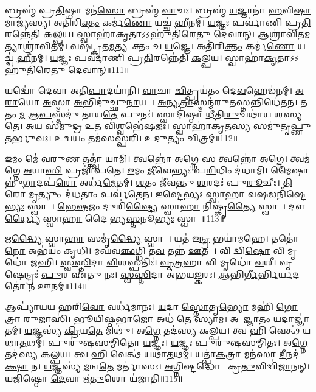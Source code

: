 𑌬𑍍𑌰𑌹𑍍𑌮॑ 𑌪𑍍𑌰\ul{𑌤𑌿}𑌷𑍍𑌠𑌾 𑌮𑌨॑\ul{𑌸𑍋} 𑌬𑍍𑌰𑌹𑍍𑌮॑ \ul{𑌵𑌾}𑌚𑌃।
𑌬𑍍𑌰𑌹𑍍𑌮॑ \ul{𑌯}𑌜𑍍𑌞𑌾𑌨𑌾॑ \ul{𑌹}𑌵𑌿\ul{𑌷𑌾}𑌮𑌾𑌜𑍍𑌯॑𑌸𑍍𑌯।
𑌅𑌤𑌿॑𑌰𑌿\ul{𑌕𑍍𑌤𑌂} 𑌕𑌰𑍍𑌮॑\ul{𑌣𑍋} 𑌯𑌚𑍍𑌚॑ \ul{𑌹𑍀}𑌨𑌮𑍍।
\ul{𑌯}𑌜𑍍𑌞𑌃 𑌪𑌰𑍍𑌵𑌾॑𑌣𑌿 𑌪𑍍𑌰\ul{𑌤𑌿}𑌰𑌨𑍍𑌨𑍇॑𑌤𑌿 \ul{𑌕}𑌲𑍍𑌪𑌯\sn{}।
𑌸𑍍𑌵𑌾𑌹𑌾॑\ul{𑌕𑍃}𑌤𑌾\-𑌽𑌽𑌹𑍁॑𑌤𑌿𑌰𑍇𑌤𑍁 \ul{𑌦𑍇}𑌵𑌾𑌨𑍍।
𑌆𑌶𑍍𑌰𑌾॑𑌵𑌿𑌤\ul{𑌮}𑌤𑍍𑌯𑌾𑌶𑍍𑌰𑌾॑𑌵𑌿𑌤𑌮𑍍।
𑌵𑌷॑𑌟𑍍𑌕𑍃𑌤\ul{𑌮}𑌤𑍍𑌯𑌨𑍂᳚𑌕𑍍𑌤𑌂 𑌚 \ul{𑌯}𑌜𑍍𑌞𑍇।
𑌅𑌤𑌿॑𑌰𑌿\ul{𑌕𑍍𑌤𑌂} 𑌕𑌰𑍍𑌮॑\ul{𑌣𑍋} 𑌯𑌚𑍍𑌚॑ \ul{𑌹𑍀}𑌨𑌮𑍍।
\ul{𑌯}𑌜𑍍𑌞𑌃 𑌪𑌰𑍍𑌵𑌾॑𑌣𑌿 𑌪𑍍𑌰\ul{𑌤𑌿}𑌰𑌨𑍍𑌨𑍇॑𑌤𑌿 \ul{𑌕}𑌲𑍍𑌪𑌯\sn{}।
𑌸𑍍𑌵𑌾𑌹𑌾॑\ul{𑌕𑍃}𑌤𑌾\-𑌽𑌽𑌹𑍁॑𑌤𑌿𑌰𑍇𑌤𑍁 \ul{𑌦𑍇}𑌵𑌾𑌨𑍍॥111॥

𑌯𑌦𑍍𑌵𑍋॑ 𑌦𑍇𑌵𑌾 𑌅𑌤𑌿\ul{𑌪𑌾}𑌦𑌯𑌾॑𑌨𑌿।
\ul{𑌵𑌾}𑌚𑌾 \ul{𑌚𑌿}𑌤𑍍𑌪𑍍𑌰𑌯॑𑌤𑌂 𑌦𑍇\ul{𑌵}𑌹𑍇𑌡॑𑌨𑌮𑍍।
\ul{𑌅}\ul{𑌰𑌾}𑌯𑍋 \ul{𑌅}𑌸𑍍𑌮𑌾 \ul{𑌅}𑌭𑌿𑌦𑍁॑𑌚𑍍𑌛𑍁\ul{𑌨𑌾}𑌯𑌤𑍇᳚।
\ul{𑌅}𑌨𑍍𑌯\ul{𑌤𑍍𑌰𑌾}𑌸𑍍𑌮𑌨𑍍𑌮॑𑌰𑍁\ul{𑌤}𑌸𑍍𑌤𑌨𑍍𑌨𑌿𑌧𑍇॑\-𑌤𑌨।
\ul{𑌤}𑌤𑌂 \ul{𑌮} 𑌆\ul{𑌪}𑌸𑍍𑌤𑌦𑍁॑ 𑌤𑌾𑌯\ul{𑌤𑍇} 𑌪𑍁𑌨𑌃॑।
𑌸𑍍𑌵𑌾𑌦𑌿॑𑌷𑍍𑌠𑌾 \ul{𑌧𑍀}𑌤𑌿\ul{𑌰𑍁}𑌚𑌥𑌾॑𑌯 𑌶𑌸𑍍𑌯𑌤𑍇।
\ul{𑌅}𑌯 𑌸॑\ul{𑌮𑍁}𑌦𑍍𑌰 \ul{𑌉}𑌤 \ul{𑌵𑌿}𑌶𑍍𑌵𑌭𑍇॑𑌷𑌜𑌃।
𑌸𑍍𑌵𑌾𑌹𑌾॑𑌕𑍃𑌤\ul{𑌸𑍍𑌯} 𑌸𑌮𑍁॑𑌤𑍃𑌪𑍍𑌣𑍁𑌤𑌰𑍍𑌭𑍁𑌵𑌃।
𑌉\ul{𑌦𑍍𑌵}𑌯𑌂 𑌤𑌮॑\ul{𑌸}𑌸𑍍𑌪𑌰𑌿॑।
𑌉\ul{𑌦𑍁}𑌤𑍍𑌯𑌂 \ul{𑌚𑌿}𑌤𑍍𑌰𑌮𑍍॥112॥

\ul{𑌇}𑌮𑌂 𑌮𑍇॑ 𑌵𑌰𑍁\ul{𑌣} 𑌤𑌤𑍍𑌤𑍍𑌵𑌾॑ 𑌯𑌾𑌮𑌿।
𑌤𑍍𑌵𑌨𑍍𑌨𑍋॑ 𑌅\ul{𑌗𑍍𑌨𑍇} 𑌸 𑌤𑍍𑌵𑌨𑍍𑌨𑍋॑ 𑌅𑌗𑍍𑌨𑍇।
𑌤𑍍𑌵𑌮॑𑌗𑍍𑌨𑍇 \ul{𑌅}𑌯𑌾\ul{𑌸𑌿} 𑌪𑍍𑌰𑌜𑌾॑𑌪𑌤𑍇।
\ul{𑌇}𑌮𑌂 \ul{𑌜𑍀}𑌵𑍇𑌭𑍍𑌯𑌃॑ 𑌪\ul{𑌰𑌿}𑌧𑌿𑌂 𑌦॑𑌧𑌾𑌮𑌿।
𑌮𑍈𑌷𑌾𑌨𑍍𑌨𑍁॑\ul{𑌗𑌾}𑌦𑌪॑\ul{𑌰𑍋} 𑌅𑌰𑍍𑌧॑\ul{𑌮𑍇}𑌤𑌮𑍍।
\ul{𑌶}𑌤𑌂 𑌜𑍀॑𑌵𑌨𑍍𑌤𑍁 \ul{𑌶}𑌰𑌦𑌃॑ 𑌪𑍁\ul{𑌰𑍂}𑌚𑍀𑌃।
\ul{𑌤𑌿}𑌰𑍋 \ul{𑌮𑍃}𑌤𑍍𑌯𑍁𑌂 𑌦॑𑌧\ul{𑌤𑌾𑌂} 𑌪𑌰𑍍𑌵॑𑌤𑍇𑌨।
\ul{𑌇}𑌷𑍍𑌟𑍇\ul{𑌭𑍍𑌯𑌃} 𑌸𑍍𑌵𑌾\ul{𑌹𑌾} 𑌵\ul{𑌷}𑌡𑌨𑌿॑𑌷𑍍𑌟𑍇\ul{𑌭𑍍𑌯𑌃} 𑌸𑍍𑌵𑌾𑌹𑌾᳚।
\ul{𑌭𑍇}\ul{𑌷}𑌜𑌂 𑌦𑍁𑌰𑌿॑\ul{𑌷𑍍𑌟𑍍𑌯𑍈} 𑌸𑍍𑌵𑌾\ul{𑌹𑌾} 𑌨𑌿𑌷𑍍𑌕𑍃॑\ul{𑌤𑍍𑌯𑍈} 𑌸𑍍𑌵𑌾𑌹𑌾᳚।
𑌦𑍗𑌰𑌾᳚\ul{𑌰𑍍𑌧𑍍𑌯𑍈} 𑌸𑍍𑌵𑌾\ul{𑌹𑌾} 𑌦𑍈𑌵𑍀᳚𑌭𑍍𑌯\ul{𑌸𑍍𑌤}𑌨𑍂\ul{𑌭𑍍𑌯𑌃} 𑌸𑍍𑌵𑌾𑌹𑌾᳚॥113॥

𑌋\ul{𑌦𑍍𑌧𑍍𑌯𑍈} 𑌸𑍍𑌵𑌾\ul{𑌹𑌾} 𑌸𑌮𑍃॑\ul{𑌦𑍍𑌧𑍍𑌯𑍈} 𑌸𑍍𑌵𑌾𑌹𑌾᳚।
𑌯𑌤॑ 𑌇\ul{𑌨𑍍𑌦𑍍𑌰} 𑌭𑌯𑌾॑𑌮𑌹𑍇।
𑌤𑌤𑍋॑ \ul{𑌨𑍋} 𑌅𑌭॑𑌯𑌂 𑌕𑍃𑌧𑌿।
𑌮𑌘॑𑌵\ul{𑌞𑍍𑌛}𑌗𑍍𑌧𑌿 𑌤\ul{𑌵} 𑌤𑌨𑍍𑌨॑ \ul{𑌊}𑌤𑌯𑍇᳚।
𑌵𑌿 𑌦𑍍𑌵𑌿\ul{𑌷𑍋} 𑌵𑌿 𑌮𑍃𑌧𑍋॑ 𑌜𑌹𑌿।
\ul{𑌸𑍍𑌵}\ul{𑌸𑍍𑌤𑌿}𑌦𑌾 \ul{𑌵𑌿}𑌶𑌸𑍍𑌪𑌤𑌿𑌃॑।
\ul{𑌵𑍃}\ul{𑌤𑍍𑌰}𑌹𑌾 𑌵𑌿 𑌮𑍃𑌧𑍋॑ \ul{𑌵}𑌶𑍀।
𑌵𑍃𑌷𑍇𑌨𑍍𑌦𑍍𑌰𑌃॑ \ul{𑌪𑍁}𑌰 𑌏॑𑌤𑍁 𑌨𑌃।
\ul{𑌸𑍍𑌵}\ul{𑌸𑍍𑌤𑌿}𑌦𑌾 𑌅॑𑌭𑌯\ul{𑌙𑍍𑌕}𑌰𑌃।
\ul{𑌆}𑌭𑌿\ul{𑌰𑍍𑌗𑍀}𑌰𑍍𑌭𑌿𑌰𑍍𑌯𑌦𑌤𑍋॑ 𑌨 \ul{𑌊}𑌨𑌮𑍍॥114॥

𑌆𑌪𑍍𑌯𑌾॑𑌯𑌯 𑌹𑌰𑌿\ul{𑌵𑍋} 𑌵𑌰𑍍𑌧॑𑌮𑌾𑌨𑌃।
\ul{𑌯}𑌦𑌾 \ul{𑌸𑍍𑌤𑍋}𑌤𑍃\ul{𑌭𑍍𑌯𑍋} 𑌮𑌹𑌿॑ \ul{𑌗𑍋}𑌤𑍍𑌰𑌾 \ul{𑌰𑍁}𑌜𑌾𑌸𑌿॑।
\ul{𑌭𑍂}\ul{𑌯𑌿}\ul{𑌷𑍍𑌠}𑌭𑌾\ul{𑌜𑍋} 𑌅𑌧॑ 𑌤𑍇 𑌸𑍍𑌯𑌾𑌮।
𑌅𑌨𑌾᳚𑌜𑍍𑌞𑌾\ul{𑌤𑌂} 𑌯𑌦𑌾𑌜𑍍𑌞𑌾॑𑌤𑌮𑍍।
\ul{𑌯}𑌜𑍍𑌞𑌸𑍍𑌯॑ \ul{𑌕𑍍𑌰𑌿}𑌯\ul{𑌤𑍇} 𑌮𑌿𑌥𑍁॑।
𑌅\ul{𑌗𑍍𑌨𑍇} 𑌤𑌦॑𑌸𑍍𑌯 𑌕𑌲𑍍𑌪𑌯।
𑌤𑍍𑌵 𑌹𑌿 𑌵𑍇𑌤𑍍𑌥॑ 𑌯𑌥𑌾\ul{𑌤}𑌥𑌮𑍍।
𑌪𑍁𑌰𑍁॑𑌷𑌸𑌮𑍍𑌮𑌿𑌤𑍋 \ul{𑌯}𑌜𑍍𑌞𑌃।
\ul{𑌯}𑌜𑍍𑌞𑌃 𑌪𑍁𑌰𑍁॑𑌷𑌸𑌮𑍍𑌮𑌿𑌤𑌃।
𑌅\ul{𑌗𑍍𑌨𑍇} 𑌤𑌦॑𑌸𑍍𑌯 𑌕𑌲𑍍𑌪𑌯।
𑌤𑍍𑌵 𑌹𑌿 𑌵𑍇𑌤𑍍𑌥॑ 𑌯𑌥𑌾\ul{𑌤}𑌥𑌮𑍍।
𑌯𑌤𑍍𑌪𑌾॑\ul{𑌕}𑌤𑍍𑌰𑌾 𑌮𑌨॑𑌸𑌾 \ul{𑌦𑍀}𑌨𑌦॑\ul{𑌕𑍍𑌷𑌾} 𑌨।
\ul{𑌯}𑌜𑍍𑌞𑌸𑍍𑌯॑ \ul{𑌮}𑌨𑍍𑌵\ul{𑌤𑍇} 𑌮𑌰𑍍𑌤𑌾॑𑌸𑌃।
\ul{𑌅}𑌗𑍍𑌨𑌿𑌷𑍍𑌟𑌦𑍍𑌧𑍋𑌤𑌾᳚ 𑌕𑍍𑌰\ul{𑌤𑍁}𑌵𑌿𑌦𑍍𑌵𑌿॑\ul{𑌜𑌾}𑌨𑌨𑍍।
𑌯𑌜𑌿॑𑌷𑍍𑌠𑍋 \ul{𑌦𑍇}𑌵𑌾 𑌋॑\ul{𑌤𑍁}𑌶𑍋 𑌯॑𑌜𑌾𑌤𑌿॥115॥\anuvakamend[\ul{𑌦𑍇}𑌵𑌾\dng{ꣴ}\ul{𑌶𑍍𑌚𑌿}𑌤𑍍𑌰𑌂 \ul{𑌤}𑌨𑍂\ul{𑌭𑍍𑌯𑌃} 𑌸𑍍𑌵𑌾\ul{𑌹𑍋}𑌨𑌂 𑌪𑍁𑌰𑍁॑𑌷𑌸\ul{𑌮𑍍𑌮𑌿}𑌤𑍋\-𑌽\ul{𑌗𑍍𑌨𑍇} 𑌤𑌦॑𑌸𑍍𑌯 𑌕𑌲𑍍𑌪\ul{𑌯} 𑌪𑌞𑍍𑌚॑ 𑌚]

